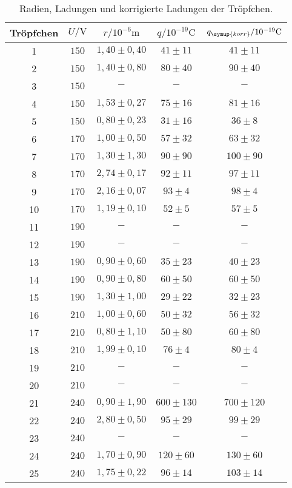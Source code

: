 \begin{table}
  \centering
  \caption{Radien, Ladungen und korrigierte Ladungen der Tröpfchen.}
  \label{tab:q}
  \begin{tabular}{c | c c c c}
    \toprule
    Tröpfchen & $U/\si{\volt}$ & $r/10^{-6}\si{\meter}$ & $q/10^{-19}\si{\coulomb}$ & $q_{\symup{korr}}/10^{-19}\si{\coulomb}$ \\
    \midrule
     1 & $150$ & $1,40 \pm 0,40$  & $41 \pm 11$   & $41 \pm 11$   \\
     2 & $150$ & $1,40 \pm 0,80$  & $80 \pm 40$   & $90 \pm 40$   \\
     3 & $150$ & $-$              & $-$           & $-$           \\
     4 & $150$ & $1,53 \pm 0,27$  & $75 \pm 16$   & $81 \pm 16$   \\
     5 & $150$ & $0,80 \pm 0,23$  & $31 \pm 16$   & $36 \pm  8$   \\
     6 & $170$ & $1,00 \pm 0,50$  & $57 \pm 32$   & $63 \pm 32$   \\
     7 & $170$ & $1,30 \pm 1,30$  & $90 \pm 90$   & $100 \pm 90$  \\
     8 & $170$ & $2,74 \pm 0,17$  & $92 \pm 11$   & $97 \pm 11$   \\
     9 & $170$ & $2,16 \pm 0,07$  & $93 \pm  4$   & $98 \pm  4$   \\
    10 & $170$ & $1,19 \pm 0,10$  & $52 \pm  5$   & $57 \pm  5$   \\
    11 & $190$ & $-$              & $-$           & $-$           \\
    12 & $190$ & $-$              & $-$           & $-$           \\
    13 & $190$ & $0,90 \pm 0,60$  & $35 \pm 23$   & $40 \pm 23$   \\
    14 & $190$ & $0,90 \pm 0,80$  & $60 \pm 50$   & $60 \pm 50$   \\
    15 & $190$ & $1,30 \pm 1,00$  & $29 \pm 22$   & $32 \pm 23$   \\
    16 & $210$ & $1,00 \pm 0,60$  & $50 \pm 32$   & $56 \pm 32$   \\
    17 & $210$ & $0,80 \pm 1,10$  & $50 \pm 80$   & $60 \pm 80$   \\
    18 & $210$ & $1,99 \pm 0,10$  & $76 \pm  4$   & $80 \pm  4$   \\
    19 & $210$ & $-$              & $-$           & $-$           \\
    20 & $210$ & $-$              & $-$           & $-$           \\
    21 & $240$ & $0,90 \pm 1,90$  & $600 \pm 130$ & $700 \pm 120$ \\
    22 & $240$ & $2,80 \pm 0,50$  & $95 \pm 29$   & $99 \pm 29$   \\
    23 & $240$ & $-$              & $-$           & $-$           \\
    24 & $240$ & $1,70 \pm 0,90$  & $120 \pm 60$  & $130 \pm 60$  \\
    25 & $240$ & $1,75 \pm 0,22$  & $96 \pm 14$   & $103 \pm 14$  \\
    \bottomrule
  \end{tabular}
\end{table}

